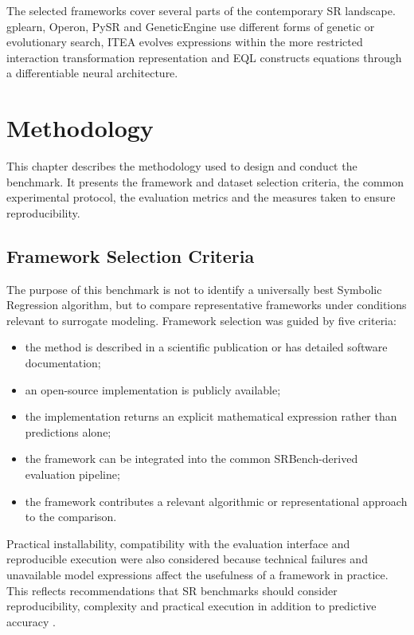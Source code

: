 \documentclass[12pt,oneside,bibtotoc,liststotoc]{scrbook}
\begin{document}
The selected frameworks cover several parts of the contemporary SR landscape. gplearn, Operon, PySR and GeneticEngine use different forms of genetic or evolutionary search, ITEA evolves expressions within the more restricted interaction transformation representation and EQL constructs equations through a differentiable neural architecture.


\chapter{Methodology}

This chapter describes the methodology used to design and conduct the benchmark. It presents the framework and dataset selection criteria, the common experimental protocol, the evaluation metrics and the measures taken to ensure reproducibility.

\section{Framework Selection Criteria}

The purpose of this benchmark is not to identify a universally best Symbolic Regression algorithm, but to compare representative frameworks under conditions relevant to surrogate modeling. Framework selection was guided by five criteria:

\begin{itemize}
    \item the method is described in a scientific publication or has detailed software documentation;
    \item an open-source implementation is publicly available;
    \item the implementation returns an explicit mathematical expression rather than predictions alone;
    \item the framework can be integrated into the common SRBench-derived evaluation pipeline;
    \item the framework contributes a relevant algorithmic or representational approach to the comparison.
\end{itemize}

Practical installability, compatibility with the evaluation interface and reproducible execution were also considered because technical failures and unavailable model expressions affect the usefulness of a framework in practice. This reflects recommendations that SR benchmarks should consider reproducibility, complexity and practical execution in addition to predictive accuracy \cite{defranca2025srbench,aldeia2025call}.
\end{document}
